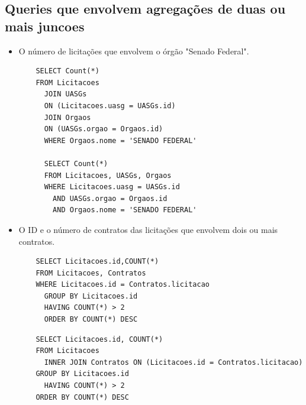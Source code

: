 \documentclass{article}
\begin{document}
\noindent
\subsection{Queries que envolvem agregações de duas ou mais juncoes}
\begin{itemize}
\item O número de licitações que envolvem o órgão "Senado Federal".
  \begin{verbatim}
    SELECT Count(*)
    FROM Licitacoes
      JOIN UASGs
      ON (Licitacoes.uasg = UASGs.id)
      JOIN Orgaos
      ON (UASGs.orgao = Orgaos.id)
      WHERE Orgaos.nome = 'SENADO FEDERAL'

      SELECT Count(*)
      FROM Licitacoes, UASGs, Orgaos
      WHERE Licitacoes.uasg = UASGs.id
        AND UASGs.orgao = Orgaos.id
        AND Orgaos.nome = 'SENADO FEDERAL'

  \end{verbatim}
  \pagebreak
\item O ID e o número de contratos das licitações que envolvem dois ou mais contratos.
  \begin{verbatim}
    SELECT Licitacoes.id,COUNT(*)
    FROM Licitacoes, Contratos 
    WHERE Licitacoes.id = Contratos.licitacao
      GROUP BY Licitacoes.id
      HAVING COUNT(*) > 2
      ORDER BY COUNT(*) DESC
  \end{verbatim}
    
  \begin{verbatim}
    SELECT Licitacoes.id, COUNT(*)
    FROM Licitacoes
      INNER JOIN Contratos ON (Licitacoes.id = Contratos.licitacao)
    GROUP BY Licitacoes.id
      HAVING COUNT(*) > 2
    ORDER BY COUNT(*) DESC
  \end{verbatim}
  
\end{itemize}
 
\end{document}

